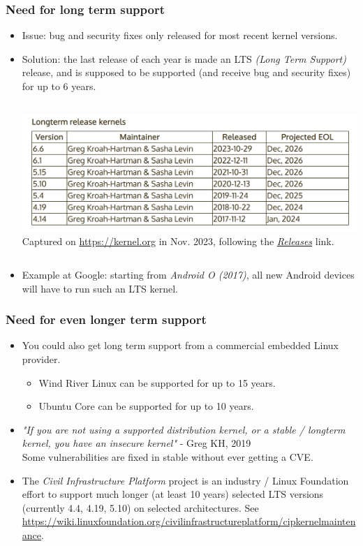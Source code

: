 \begin{frame}[fragile]
  \frametitle{Need for long term support}
  \begin{itemize}
  \item Issue: bug and security fixes only released for most recent
    kernel versions.
  \item Solution: the last release of each year is made an LTS {\em (Long Term
     Support)} release, and is supposed to be supported (and receive bug
    and security fixes) for up to 6 years.
  \begin{columns}
  \includegraphics[width=\textwidth]{common/long-term-support-kernels.png}\\
  \scriptsize
   Captured on \url{https://kernel.org} in Nov. 2023, following the
   \href{https://www.kernel.org/category/releases.html}{\em Releases} link.
  \end{columns}
  \item Example at Google: starting from {\em Android O (2017)}, all new Android devices will
    have to run such an LTS kernel.
  \end{itemize}
\end{frame}

\begin{frame}[fragile]
  \frametitle{Need for even longer term support}
  \begin{itemize}
  \item You could also get long term support from a commercial embedded
    Linux provider.
    \begin{itemize}
	\item Wind River Linux can be supported for up to 15 years.
	\item Ubuntu Core can be supported for up to 10 years.
    \end{itemize}
  \item {\em "If you are not using a supported distribution kernel, or a stable / longterm
    kernel, you have an insecure kernel"} - Greg KH, 2019\\
    Some vulnerabilities are fixed in stable without ever getting a CVE.
  \item The {\em Civil Infrastructure Platform} project is an industry /
    Linux Foundation effort to support much longer (at least 10 years)
    selected LTS versions (currently 4.4, 4.19, 5.10) on selected architectures.
    See \url{https://wiki.linuxfoundation.org/civilinfrastructureplatform/cipkernelmaintenance}.
  \end{itemize}
\end{frame}

